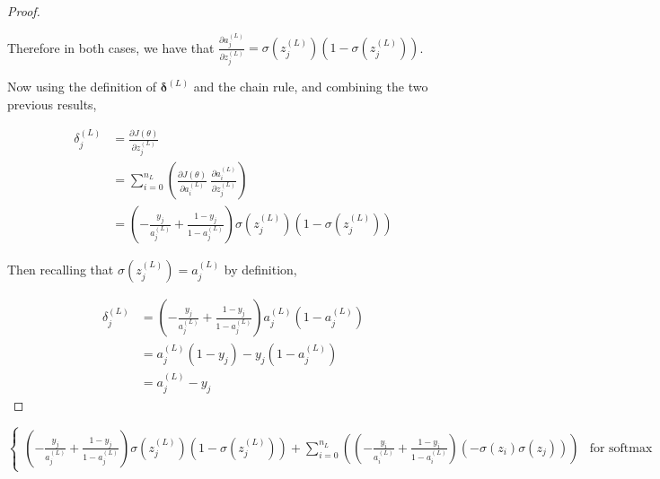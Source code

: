 \documentclass{article}
\begin{document}
\begin{proof}
\begin{itemize}
            \end{itemize}
            
            Therefore in both cases, we have that $\frac{\partial a^{(L)}_j}{\partial z^{(L)}_j} = \sigma(z^{(L)}_j) \left( 1 - \sigma(z^{(L)}_j) \right)$.
            
            Now using the definition of $\mathbf{\delta}^{(L)}$ and the chain rule, and combining the two previous results,
            
            $$ \begin{aligned}
            \delta^{(L)}_j &= \frac{\partial J(\theta)}{\partial z^{(L)}_j} \\
            &= \sum_{i = 0}^{n_L} \left( \frac{\partial J(\theta)}{\partial a^{(L)}_i} \ \frac{\partial a^{(L)}_i}{\partial z^{(L)}_j} \right) \\
            &= \left( - \frac{y_j}{a^{(L)}_j} + \frac{1 - y_j}{1 - a^{(L)}_j} \right) \sigma(z^{(L)}_j) \left( 1 - \sigma(z^{(L)}_j) \right)
            \end{aligned} $$
            
            Then recalling that $\sigma(z^{(L)}_j) = a^{(L)}_j$ by definition,
            
            $$ \begin{aligned}
            \delta^{(L)}_j &= \left( - \frac{y_j}{a^{(L)}_j} + \frac{1 - y_j}{1 - a^{(L)}_j} \right) a^{(L)}_j \left( 1 - a^{(L)}_j \right) \\
            &= a^{(L)}_j (1 - y_j) - y_j (1 - a^{(L)}_j) \\
            &= a^{(L)}_j - y_j
            \end{aligned} $$
            
    
    
    
        \end{proof}




$$ \begin{cases}
\left( - \frac{y_j}{a^{(L)}_j} + \frac{1 - y_j}{1 - a^{(L)}_j} \right) \sigma(z^{(L)}_j) \left( 1 - \sigma(z^{(L)}_j) \right) + \sum_{i=0}^{n_L} \left( \left( - \frac{y_i}{a^{(L)}_i} + \frac{1 - y_i}{1 - a^{(L)}_i} \right) \left( - \sigma(z_i) \sigma(z_j) \right) \right) & \text{for softmax activation}
\end{cases}$$
        
\end{document}
